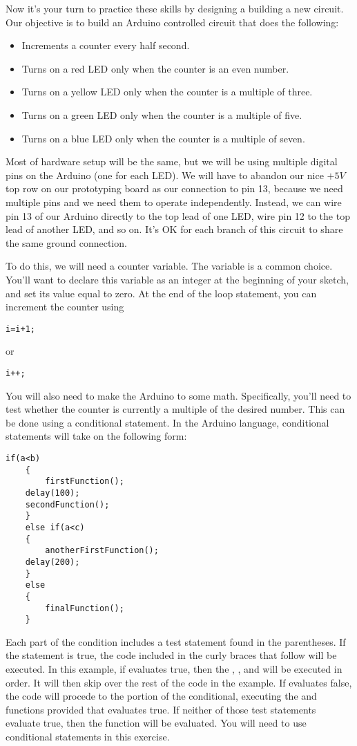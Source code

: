 Now it's your turn to practice these skills by designing a building a new
circuit. Our objective is to build an Arduino
controlled circuit that does the following:
\begin{itemize}
\item Increments a counter every half second.
\item Turns on a red LED only when the counter is an even number.
\item Turns on a yellow LED only when the counter is a multiple of three.
\item Turns on a green LED only when the counter is a multiple of five.
\item Turns on a blue LED only when the counter is a multiple of seven.
\end{itemize}
Most of hardware setup will be the same, but we will be using multiple
digital pins on the Arduino (one for each LED). We will have to abandon our 
nice $+5\unit{V}$ top row on our prototyping board as our connection to
pin 13, because we need multiple pins and we need them to operate independently.
Instead, we can wire pin 13 of our Arduino directly to the top lead of one LED, 
wire pin 12 to the top lead of another LED, and so on. It's OK for each branch
of this circuit to share the same ground connection.

To do this, we will need a counter variable. The variable  is a common
choice. You'll want to declare this variable as an integer at the beginning of
your sketch, and set its value equal to zero. At the end of the loop statement,
you can increment the counter using 
\begin{lstlisting}[language=Arduino]
    i=i+1;
\end{lstlisting}
or
\begin{lstlisting}[language=Arduino]
    i++;
\end{lstlisting}

You will also need to make the Arduino to some math. Specifically, you'll need
to test whether the counter is currently a multiple of the desired number.
This can be done using a conditional statement. In the Arduino language, 
conditional statements will take on the following form:
\begin{lstlisting}[language=Arduino] 
    if(a<b)
    {
        firstFunction();
	delay(100);
	secondFunction();
    }
    else if(a<c)
    {
        anotherFirstFunction();
	delay(200);
    }
    else
    {
        finalFunction();
    }
\end{lstlisting}
Each part of the condition includes a test statement found in the parentheses.
If the statement is true, the code included in the curly braces that follow
will be executed. In this example, if  evaluates true, then the
, , and  will be 
executed in order. It will then skip over the rest of the code in the example.
If  evaluates false, the code will procede to the 
portion of the conditional, executing the  and 
 functions provided that  evaluates true. If neither
of those test statements evaluate true, then the  function
will be evaluated. You will need to use conditional statements in this exercise.

